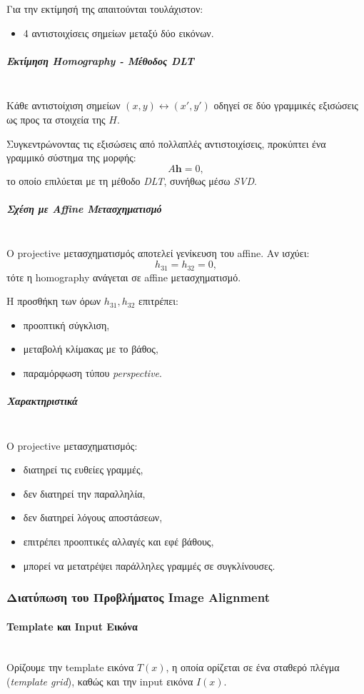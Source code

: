 \documentclass[12pt]{article}
\begin{document}
Για την εκτίμησή της απαιτούνται τουλάχιστον:
\begin{itemize}
    \item 4 αντιστοιχίσεις σημείων μεταξύ δύο εικόνων.
\end{itemize}

\subparagraph{Εκτίμηση Homography - Μέθοδος DLT}
\mbox{}\\
Κάθε αντιστοίχιση σημείων \((x,y) \leftrightarrow (x',y')\) οδηγεί σε δύο γραμμικές εξισώσεις ως προς τα στοιχεία της \(H\).

Συγκεντρώνοντας τις εξισώσεις από πολλαπλές αντιστοιχίσεις, προκύπτει ένα γραμμικό σύστημα της μορφής:
\[
A\mathbf{h} = 0,
\]
το οποίο επιλύεται με τη μέθοδο \textit{DLT}, συνήθως μέσω \textit{SVD}.

\subparagraph{Σχέση με Affine Μετασχηματισμό}
\mbox{}\\
Ο projective μετασχηματισμός αποτελεί γενίκευση του affine. Αν ισχύει:
\[
h_{31} = h_{32} = 0,
\]
τότε η homography ανάγεται σε affine μετασχηματισμό.

Η προσθήκη των όρων \(h_{31}, h_{32}\) επιτρέπει:
\begin{itemize}
    \item προοπτική σύγκλιση,
    \item μεταβολή κλίμακας με το βάθος,
    \item παραμόρφωση τύπου \textit{perspective}.
\end{itemize}

\subparagraph{Χαρακτηριστικά}
\mbox{}\\
Ο projective μετασχηματισμός:
\begin{itemize}
    \item διατηρεί τις ευθείες γραμμές,
    \item δεν διατηρεί την παραλληλία,
    \item δεν διατηρεί λόγους αποστάσεων,
    \item επιτρέπει προοπτικές αλλαγές και εφέ βάθους,
    \item μπορεί να μετατρέψει παράλληλες γραμμές σε συγκλίνουσες.
\end{itemize}



\subsubsection{Διατύπωση του Προβλήματος Image Alignment}

\paragraph{Template και Input Εικόνα}
\mbox{}\\
Ορίζουμε την template εικόνα \(T(x)\), η οποία ορίζεται σε ένα σταθερό πλέγμα (\textit{template grid}), καθώς και την input εικόνα \(I(x)\).
\end{document}
